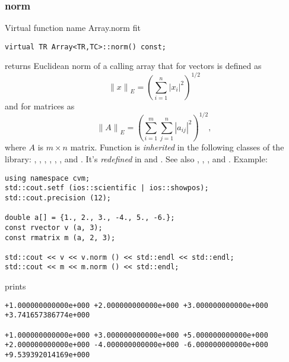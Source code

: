 \subsubsection{norm}
Virtual function%
\pdfdest name {Array.norm} fit
\begin{verbatim}
virtual TR Array<TR,TC>::norm() const;
\end{verbatim}
returns Euclidean norm of a calling array that for vectors is defined as
\begin{equation*}
{\|x\|}_E=\left(\sum_{i=1}^{n} |x_i|^2\right)^{1/2}
\end{equation*}
and for matrices as
\begin{equation*}
{\|A\|}_E=\left(\sum_{i=1}^{m}\sum_{j=1}^{n} |a_{ij}|^2\right)^{1/2},
\end{equation*}
where $A$ is $m\times n$ matrix.
Function is \emph{inherited}
in the following classes of the library:
,   ,
,   ,
, ,
 and .
It's \emph{redefined} in
 and .
See also ,
,
,
 and
.
Example:
\begin{Verbatim}
using namespace cvm;
std::cout.setf (ios::scientific | ios::showpos);
std::cout.precision (12);

double a[] = {1., 2., 3., -4., 5., -6.};
const rvector v (a, 3);
const rmatrix m (a, 2, 3);

std::cout << v << v.norm () << std::endl << std::endl;
std::cout << m << m.norm () << std::endl;
\end{Verbatim}
prints
\begin{Verbatim}
+1.000000000000e+000 +2.000000000000e+000 +3.000000000000e+000
+3.741657386774e+000

+1.000000000000e+000 +3.000000000000e+000 +5.000000000000e+000
+2.000000000000e+000 -4.000000000000e+000 -6.000000000000e+000
+9.539392014169e+000
\end{Verbatim}
\newpage


